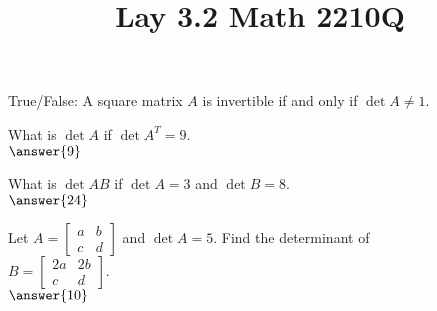 \documentclass{ximera}
\begin{document}
  	\title{Lay 3.2  \hfill Math 2210Q} 

  \begin{question} True/False: A square matrix $A$ is invertible if and only if $\det A \neq 1$.\\
  	
  	\begin{multipleChoice}
  		\end{multipleChoice}
  	
  	\end{question}	
   \begin{question} What is $\det A$ if $\det A^T = 9$.\\
   	
   $	\answer{9}$
   	
   \end{question}	
   \begin{question} What is $\det AB$ if $\det A = 3$ and $\det B = 8$.\\
   	
   $	\answer{24}$
   	
   \end{question}	
   
   \begin{question} Let $A = \begin{bmatrix} a & b\\ c&d\end{bmatrix}$ and $\det A = 5$. Find the determinant of \\ $B = \begin{bmatrix} 2a & 2b\\ c&d\end{bmatrix}$.\\
   	
   $	\answer{10}$
   	
   \end{question}	
   
\end{document}
